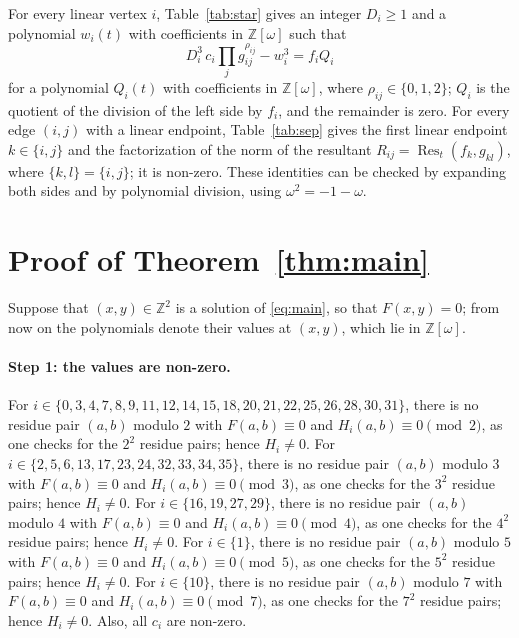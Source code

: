 \documentclass[11pt]{article}
\newcommand{\Z}{\mathbb{Z}}
\begin{document}
For every linear vertex $i$, Table~\ref{tab:star} gives an integer $D_i\geq1$ and a polynomial $w_i(t)$ with coefficients in $\Z[\omega]$ such that
\begin{equation}\label{eq:starlin}
D_i^3\,c_i\prod_jg_{ij}^{\rho_{ij}}-w_i^3=f_iQ_i
\end{equation}
for a polynomial $Q_i(t)$ with coefficients in $\Z[\omega]$, where $\rho_{ij}\in\{0,1,2\}$; $Q_i$ is the quotient of the division of the left side by $f_i$, and the remainder is zero.
For every edge $(i,j)$ with a linear endpoint, Table~\ref{tab:sep} gives the first linear endpoint $k\in\{i,j\}$ and the factorization of the norm of the resultant $R_{ij}=\operatorname{Res}_t(f_k,g_{kl})$, where $\{k,l\}=\{i,j\}$; it is non-zero.
These identities can be checked by expanding both sides and by polynomial division, using $\omega^2=-1-\omega$.

\section{Proof of Theorem~\ref{thm:main}}

Suppose that $(x,y)\in\Z^2$ is a solution of \eqref{eq:main}, so that $F(x,y)=0$; from now on the polynomials denote their values at $(x,y)$, which lie in $\Z[\omega]$.
\paragraph{Step 1: the values are non-zero.} For $i\in\{0,\allowbreak 3,\allowbreak 4,\allowbreak 7,\allowbreak 8,\allowbreak 9,\allowbreak 11,\allowbreak 12,\allowbreak 14,\allowbreak 15,\allowbreak 18,\allowbreak 20,\allowbreak 21,\allowbreak 22,\allowbreak 25,\allowbreak 26,\allowbreak 28,\allowbreak 30,\allowbreak 31\}$, there is no residue pair $(a,b)$ modulo $2$ with $F(a,b)\equiv0$ and $H_i(a,b)\equiv0\pmod{2}$, as one checks for the $2^2$ residue pairs; hence $H_i\neq0$. For $i\in\{2,\allowbreak 5,\allowbreak 6,\allowbreak 13,\allowbreak 17,\allowbreak 23,\allowbreak 24,\allowbreak 32,\allowbreak 33,\allowbreak 34,\allowbreak 35\}$, there is no residue pair $(a,b)$ modulo $3$ with $F(a,b)\equiv0$ and $H_i(a,b)\equiv0\pmod{3}$, as one checks for the $3^2$ residue pairs; hence $H_i\neq0$. For $i\in\{16,\allowbreak 19,\allowbreak 27,\allowbreak 29\}$, there is no residue pair $(a,b)$ modulo $4$ with $F(a,b)\equiv0$ and $H_i(a,b)\equiv0\pmod{4}$, as one checks for the $4^2$ residue pairs; hence $H_i\neq0$. For $i\in\{1\}$, there is no residue pair $(a,b)$ modulo $5$ with $F(a,b)\equiv0$ and $H_i(a,b)\equiv0\pmod{5}$, as one checks for the $5^2$ residue pairs; hence $H_i\neq0$. For $i\in\{10\}$, there is no residue pair $(a,b)$ modulo $7$ with $F(a,b)\equiv0$ and $H_i(a,b)\equiv0\pmod{7}$, as one checks for the $7^2$ residue pairs; hence $H_i\neq0$. Also, all $c_i$ are non-zero.
\end{document}
